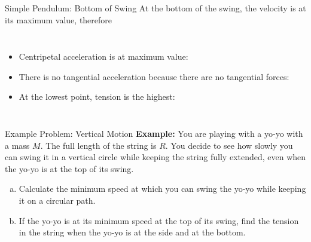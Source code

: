 \documentclass[12pt,compress,aspectratio=169]{beamer}
\begin{document}
\begin{frame}{Simple Pendulum: Bottom of Swing}
  At the bottom of the swing, the velocity is at its maximum value,
  therefore
  \vspace{.1in}\begin{columns}

    \begin{itemize}
    \item Centripetal acceleration is at maximum value:

    \item There is no tangential acceleration because there are no tangential
      forces:

    \item At the lowest point, tension is the highest:

    \end{itemize}
  \end{columns}
\end{frame}



\begin{frame}{Example Problem: Vertical Motion}
  \textbf{Example:} You are playing with a yo-yo with a mass $M$. The full
  length of the string is $R$. You decide to see how slowly you can swing it in
  a vertical circle while keeping the string fully extended, even when the
  yo-yo is at the top of its swing.
  \begin{enumerate}[a.]
  \item Calculate the minimum speed at which you can swing the yo-yo while
    keeping it on a circular path.
  \item If the yo-yo is at its minimum speed at the top of its swing, find the
    tension in the string when the yo-yo is at the side and at the bottom.
  \end{enumerate}
\end{frame}
\end{document}
